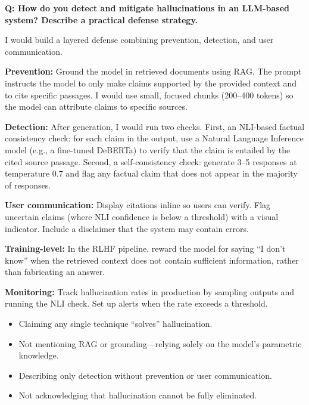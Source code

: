 \begin{interviewq}
\textbf{Q: How do you detect and mitigate hallucinations in an LLM-based system?
Describe a practical defense strategy.}

 \quad {} \quad \badgefreq{\freqhigh}

\stronganswer
I would build a layered defense combining prevention, detection, and user
communication.

\textbf{Prevention:} Ground the model in retrieved documents using RAG.  The
prompt instructs the model to only make claims supported by the provided
context and to cite specific passages.  I would use small, focused chunks
(200--400 tokens) so the model can attribute claims to specific sources.

\textbf{Detection:} After generation, I would run two checks.  First, an
NLI-based factual consistency check: for each claim in the output, use a
Natural Language Inference model (e.g., a fine-tuned DeBERTa) to verify
that the claim is entailed by the cited source passage.  Second, a
self-consistency check: generate 3--5 responses at temperature 0.7 and flag
any factual claim that does not appear in the majority of responses.

\textbf{User communication:} Display citations inline so users can verify.
Flag uncertain claims (where NLI confidence is below a threshold) with a
visual indicator.  Include a disclaimer that the system may contain errors.

\textbf{Training-level:} In the RLHF pipeline, reward the model for
saying ``I don't know'' when the retrieved context does not contain
sufficient information, rather than fabricating an answer.

\textbf{Monitoring:} Track hallucination rates in production by sampling
outputs and running the NLI check.  Set up alerts when the rate exceeds
a threshold.

\redflags
\begin{itemize}
    \item Claiming any single technique ``solves'' hallucination.
    \item Not mentioning RAG or grounding---relying solely on the model's
    parametric knowledge.
    \item Describing only detection without prevention or user communication.
    \item Not acknowledging that hallucination cannot be fully eliminated.
\end{itemize}


\end{interviewq}
